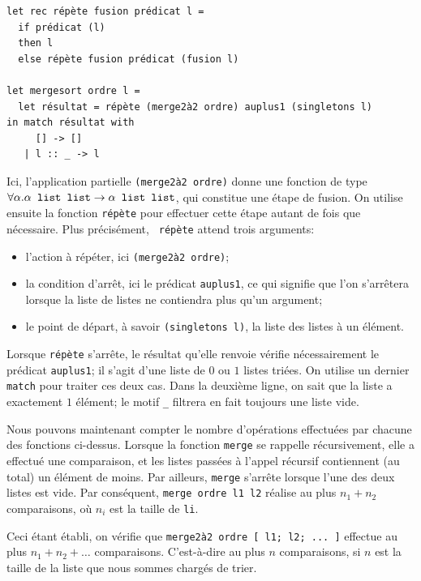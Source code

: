 \documentclass[11pt, a4paper]{article}
\begin{document}
\begin{verbatim}
let rec répète fusion prédicat l =
  if prédicat (l)
  then l
  else répète fusion prédicat (fusion l)

let mergesort ordre l =
  let résultat = répète (merge2à2 ordre) auplus1 (singletons l)
in match résultat with
     [] -> []
   | l :: _ -> l
\end{verbatim}


Ici, l'application partielle \verb+(merge2à2 ordre)+ donne une
fonction de type $\forall\alpha.\alpha\text{\tt\ list
list}\rightarrow\alpha\text{\tt\ list list}$, qui constitue une étape
de fusion.  On utilise ensuite la fonction {\tt répète} pour effectuer
cette étape autant de fois que nécessaire. Plus précisément, {\tt
répète} attend trois arguments:

\begin{itemize}
\item l'action à répéter, ici \verb+(merge2à2 ordre)+;
\item la condition d'arrêt, ici le prédicat {\tt auplus1}, ce qui
      signifie que l'on s'arrêtera lorsque la liste de listes ne
      contiendra plus qu'un argument;
\item le point de départ, à savoir \verb+(singletons l)+, la liste des
      listes à un élément.
\end{itemize}

Lorsque {\tt répète} s'arrête, le résultat qu'elle renvoie vérifie
nécessairement le prédicat {\tt auplus1}; il s'agit d'une liste de $0$
ou $1$ listes triées. On utilise un dernier {\tt match} pour traiter
ces deux cas.  Dans la deuxième ligne, on sait que la liste a
exactement $1$ élément; le motif \verb+_+ filtrera en fait toujours
une liste vide.

Nous pouvons maintenant compter le nombre d'opérations effectuées par
chacune des fonctions ci-dessus. Lorsque la fonction {\tt merge} se
rappelle récursivement, elle a effectué une comparaison, et les listes
passées à l'appel récursif contiennent (au total) un élément de
moins. Par ailleurs, {\tt merge} s'arrête lorsque l'une des deux
listes est vide. Par conséquent, \verb+merge ordre l1 l2+ réalise au
plus $n_1+n_2$ comparaisons, où $n_i$ est la taille de {\tt li}.

Ceci étant établi, on vérifie que
\verb+merge2à2 ordre [ l1; l2; ... ]+ effectue au plus $n_1 + n_2 +
\ldots$ comparaisons. C'est-à-dire au plus $n$ comparaisons, si $n$
est la taille de la liste que nous sommes chargés de trier.
\end{document}
